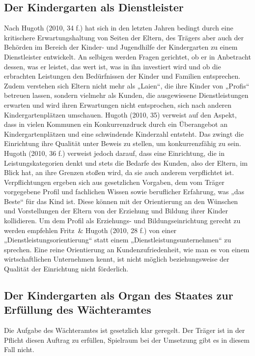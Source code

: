 \subsection{Der Kindergarten als Dienstleister}
Nach Hugoth (2010, 34 f.) hat sich in den letzten Jahren bedingt durch eine kritischere Erwartungshaltung von Seiten der Eltern, des Trägers aber auch der Behörden im Bereich der Kinder- und Jugendhilfe der Kindergarten zu einem Dienstleister entwickelt. An selbigen werden  Fragen gerichtet, ob er in Anbetracht dessen, was er leistet, das wert ist, was in ihn investiert wird und ob die erbrachten Leistungen den Bedürfnissen der Kinder und Familien entsprechen. Zudem verstehen sich Eltern nicht mehr als „Laien“, die ihre Kinder von „Profis“ betreuen lassen, sondern vielmehr als Kunden, die ausgewiesene Dienstleistungen erwarten und wird ihren Erwartungen nicht entsprochen, sich nach anderen Kindergartenplätzen umschauen. Hugoth (2010, 35) verweist auf den Aspekt, dass in vielen Kommunen ein Konkurrenzdruck durch ein Überangebot an Kindergartenplätzen und eine schwindende Kinderzahl entsteht. Das zwingt die Einrichtung ihre Qualität unter Beweis zu stellen, um konkurrenzfähig zu sein. 
Hugoth (2010, 36 f.) verweist jedoch darauf, dass eine Einrichtung, die in Leistungskategorien denkt und stets die Bedarfe des Kunden, also der Eltern, im Blick hat, an ihre Grenzen stoßen wird, da sie auch anderem verpflichtet ist. Verpflichtungen ergeben sich aus gesetzlichen Vorgaben, dem vom Träger vorgegebene Profil und fachlichen Wissen sowie beruflicher Erfahrung, was „das Beste“ für das Kind ist. Diese können mit der Orientierung an den Wünschen und Vorstellungen der Eltern von der Erziehung und Bildung ihrer Kinder kollidieren. Um dem Profil als Erziehungs- und Bildungseinrichtung gerecht zu werden empfehlen Fritz~\& Hugoth (2010, 28 f.) von einer „Dienstleistungsorientierung“ statt einem „Dienstleistungsunternehmen“ zu sprechen. Eine reine Orientierung an Kundenzufriedenheit, wie man es von einem wirtschaftlichen Unternehmen kennt, ist nicht möglich beziehungsweise der Qualität der Einrichtung nicht förderlich. 

\subsection{Der Kindergarten als Organ des Staates zur Erfüllung des Wächteramtes}
Die Aufgabe des Wächteramtes ist gesetzlich klar geregelt. Der Träger ist in der Pflicht diesen Auftrag zu erfüllen, Spielraum bei der Umsetzung gibt es in diesem Fall nicht.
 
